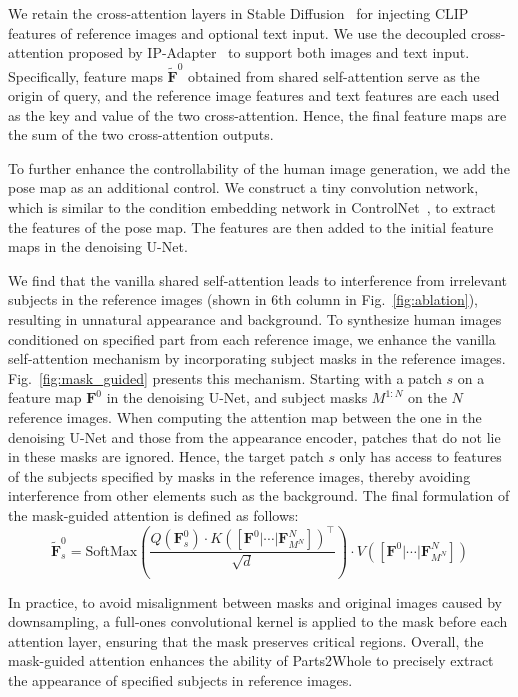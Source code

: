We retain the cross-attention layers in Stable Diffusion~\cite{rombach2022ldm} for injecting CLIP features of reference images and optional text input. We use the decoupled cross-attention proposed by IP-Adapter~\cite{ye2023ipadapter} to support both images and text input. Specifically, feature maps $\tilde{\bm{F}}^{0}$ obtained from shared self-attention serve as the origin of query, and the reference image features and text features are each used as the key and value of the two cross-attention. Hence, the final feature maps are the sum of the two cross-attention outputs.

To further enhance the controllability of the human image generation, we add the pose map as an additional control. We construct a tiny convolution network, which is similar to the condition embedding network in ControlNet~\cite{zhang2023controlnet}, to extract the features of the pose map. The features are then added to the initial feature maps in the denoising U-Net.

We find that the vanilla shared self-attention leads to interference from irrelevant subjects in the reference images (shown in 6th column in Fig.~\ref{fig:ablation}), resulting in unnatural appearance and background. To synthesize human images conditioned on specified part from each reference image, we enhance the vanilla self-attention mechanism by incorporating subject masks in the reference images. Fig.~\ref{fig:mask_guided} presents this mechanism. Starting with a patch $s$ on a feature map $\bm{F}^{0}$ in the denoising U-Net, and subject masks $M^{1:N}$ on the $N$ reference images. When computing the attention map between the one in the denoising U-Net and those from the appearance encoder, patches that do not lie in these masks are ignored. Hence, the target patch $s$ only has access to features of the subjects specified by masks in the reference images, thereby avoiding interference from other elements such as the background. The final formulation of the mask-guided attention is defined as follows:
\begin{equation}
    \tilde{\bm{F}}_{s}^{0} = \text{SoftMax}\left(
    \frac{
    Q(\bm{F}_s^0)\cdot K([\bm{F}^{0}|\cdots|\bm{F}^{N}_{M^{N}}])^{\top}
    }{
    \sqrt{d}
    }\right)\cdot V([\bm{F}^{0}|\cdots|\bm{F}^{N}_{M^{N}}])
    \label{eq:mask_guided_self_attn}
\end{equation}

In practice, to avoid misalignment between masks and original images caused by downsampling, a full-ones convolutional kernel is applied to the mask before each attention layer, ensuring that the mask preserves critical regions. Overall, the mask-guided attention enhances the ability of Parts2Whole to precisely extract the appearance of specified subjects in reference images.
